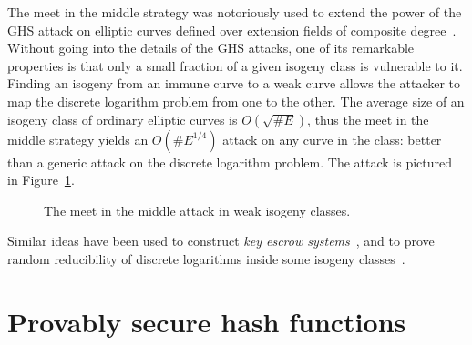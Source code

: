 \documentclass[10pt]{article}
\theoremstyle{plain}
\theoremstyle{definition}
\begin{document}
The meet in the middle strategy was notoriously used to extend the
power of the GHS attack on elliptic curves defined over extension
fields of composite degree~\cite{gaudry+hess+smart02,GHS}. %
Without going into the details of the GHS attacks, one of its
remarkable properties is that only a small fraction of a given isogeny
class is vulnerable to it. %
Finding an isogeny from an immune curve to a weak curve allows the
attacker to map the discrete logarithm problem from one to the
other. %
The average size of an isogeny class of ordinary elliptic curves is
$O(\sqrt{\#E})$, thus the meet in the middle strategy yields an
$O(\#E^{1/4})$ attack on any curve in the class: better than a generic
attack on the discrete logarithm problem. %
The attack is pictured in Figure~\ref{fig:ghs}.

\begin{figure}
  \centering
  \caption{The meet in the middle attack in weak isogeny classes.}
  \label{fig:ghs}
\end{figure}

Similar ideas have been used to construct \emph{key escrow
  systems}~\cite{teske06}, and to prove random reducibility of
discrete logarithms inside some isogeny classes~\cite{JMV}.

\section{Provably secure hash functions}
\end{document}
